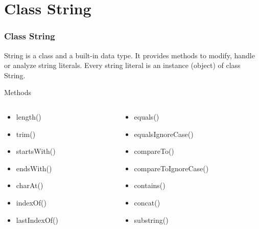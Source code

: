 \documentclass[10pt, compress]{beamer}
\begin{document}
\section{Class String}

\begin{frame}[fragile]
  \frametitle{Class String}
  String is a class and a built-in data type. It provides methods to modify, handle or analyze string literals. Every string literal is an instance (object) of class String.
  \begin{block}{Methods}
    \begin{columns}
      \begin{column}{0.5\textwidth}
        \begin{itemize}
          \item[] length()
          \item[] trim()
          \item[] startsWith()
          \item[] endsWith()
          \item[] charAt()
          \item[] indexOf()
          \item[] lastIndexOf()
        \end{itemize}
      \end{column}
      \begin{column}{0.5\textwidth}
        \begin{itemize}
          \item[] equals()
          \item[] equalsIgnoreCase()
          \item[] compareTo()
          \item[] compareToIgnoreCase()
          \item[] contains()
          \item[] concat()
          \item[] substring()
        \end{itemize}
      \end{column}
    \end{columns}
  \end{block}
\end{frame}
\end{document}
